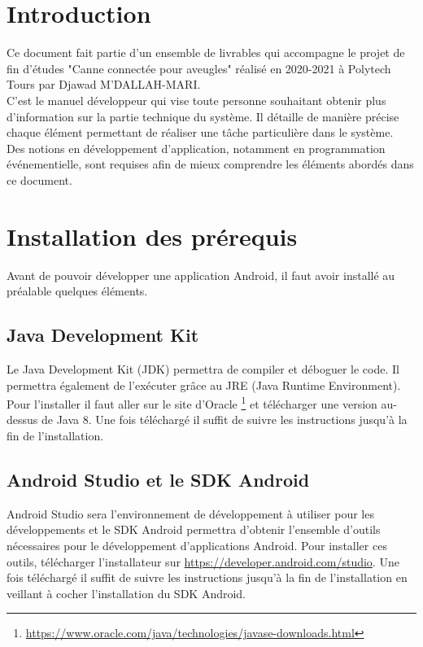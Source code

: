 \documentclass[UTF8]{EPURapport}
\begin{document}
\chapter{Introduction}

Ce document fait partie d'un ensemble de livrables qui accompagne le projet de fin d'études "Canne connectée pour aveugles" réalisé en 2020-2021 à Polytech Tours par Djawad M'DALLAH-MARI.\\

C'est le manuel développeur qui vise toute personne souhaitant obtenir plus d'information sur la partie technique du système. Il détaille de manière précise chaque élément permettant de réaliser une tâche particulière dans le système.\\

Des notions en développement d'application, notamment en programmation événementielle,  sont requises afin de mieux comprendre les éléments abordés dans ce document.

\chapter{Installation des prérequis}
Avant de pouvoir développer une application Android, il faut avoir installé au préalable quelques éléments.

\section{Java Development Kit}
Le Java Development Kit (JDK) permettra de compiler et déboguer le code. Il permettra également de l'exécuter grâce au JRE (Java Runtime Environment).\\

Pour l'installer il faut aller sur le site d'Oracle \footnote{\url{https://www.oracle.com/java/technologies/javase-downloads.html}} et télécharger une version au-dessus de Java 8. Une fois téléchargé il suffit de suivre les instructions jusqu'à la fin de l'installation.

\section{Android Studio et le SDK Android}
Android Studio sera l'environnement de développement à utiliser pour les développements et le SDK Android permettra d'obtenir l'ensemble d'outils nécessaires pour le développement d'applications Android. Pour installer ces outils, télécharger l'installateur sur \url{https://developer.android.com/studio}. Une fois téléchargé il suffit de suivre les instructions jusqu'à la fin de l'installation en veillant à cocher l'installation du SDK Android.
\end{document}

